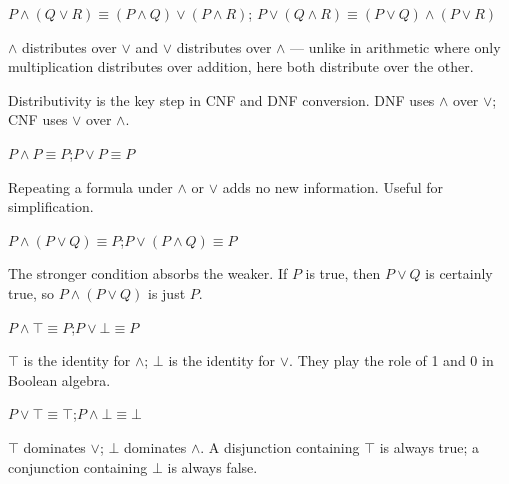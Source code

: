 \begin{proposition}[Distributivity]\label{eq:dist}
$P \wedge (Q \vee R) \equiv (P \wedge Q) \vee (P \wedge R)$;\qquad
$P \vee (Q \wedge R) \equiv (P \vee Q) \wedge (P \vee R)$
\end{proposition}
\begin{remark}[Intuition] $\wedge$ distributes over $\vee$ and $\vee$ distributes
over $\wedge$ — unlike in arithmetic where only multiplication distributes over
addition, here both distribute over the other.
\end{remark}
\begin{remark}[Consequence] Distributivity is the key step in CNF and DNF
conversion. DNF uses $\wedge$ over $\vee$; CNF uses $\vee$ over $\wedge$.
\end{remark}

\begin{proposition}[Idempotence]\label{eq:idemp}
$P \wedge P \equiv P$;\qquad $P \vee P \equiv P$
\end{proposition}
\begin{remark}[Intuition] Repeating a formula under $\wedge$ or $\vee$ adds no
new information. Useful for simplification.
\end{remark}

\begin{proposition}[Absorption]\label{eq:absorb}
$P \wedge (P \vee Q) \equiv P$;\qquad $P \vee (P \wedge Q) \equiv P$
\end{proposition}
\begin{remark}[Intuition] The stronger condition absorbs the weaker. If $P$ is
true, then $P \vee Q$ is certainly true, so $P \wedge (P \vee Q)$ is just $P$.
\end{remark}

\begin{proposition}\label{eq:identity}
$P \wedge \top \equiv P$;\qquad $P \vee \bot \equiv P$
\end{proposition}
\begin{remark}[Intuition] $\top$ is the identity for $\wedge$; $\bot$ is the
identity for $\vee$. They play the role of 1 and 0 in Boolean algebra.
\end{remark}

\begin{proposition}\label{eq:domination}
$P \vee \top \equiv \top$;\qquad $P \wedge \bot \equiv \bot$
\end{proposition}
\begin{remark}[Intuition] $\top$ dominates $\vee$; $\bot$ dominates $\wedge$.
A disjunction containing $\top$ is always true; a conjunction containing $\bot$
is always false.
\end{remark}

